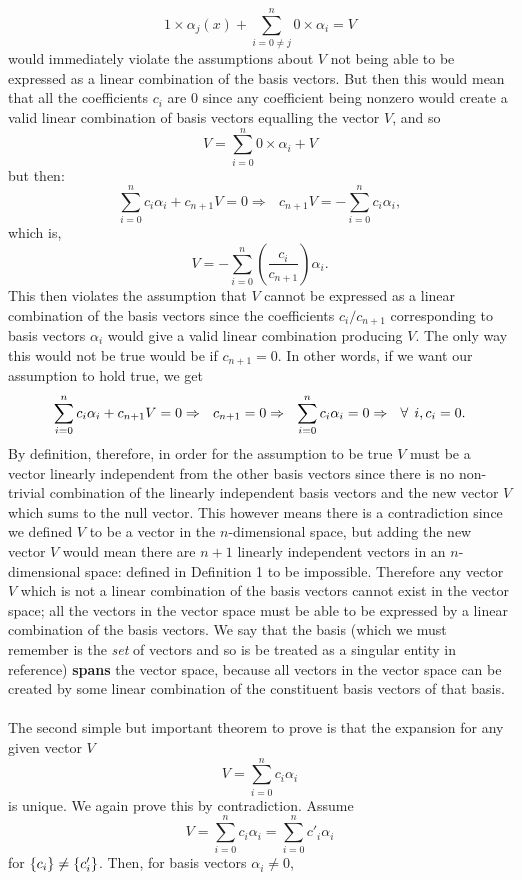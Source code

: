 $$
1\times\alpha_{j}(x)+ \sum_{i=0\neq j}^{n}0\times\alpha_{i}=V
$$ would immediately violate the assumptions about $V$ not being able to be expressed as a linear combination of the basis vectors.  But then this would mean that all the coefficients $c_{i}$ are $0$ since any coefficient being nonzero would create a valid linear combination of basis vectors equalling the vector ${V}$, and so
$$
V=\sum_{i=0}^{n}0\times\alpha_{i} + V
$$
but then:
$$
\sum_{i=0}^{n}c_{i}\alpha_{i} + c_{n+1}V= 0 \Rightarrow\:\:\: c_{n+1}V=-\sum_{i=0}^{n}c_{i}\alpha_{i},
$$
which is,
$$
V=-\sum_{i=0}^{n}\left(\frac{c_{i}}{c_{n+1}}\right)\alpha_{i}.
$$
This then violates the assumption that $V$ cannot be expressed as a linear combination of the basis vectors since the coefficients $c_{i}/c_{n+1}$ corresponding to basis vectors $\alpha_{i}$ would give a valid linear combination producing $V$. The only way this would not be true would be if $c_{n+1}=0$. In other words, if we want our assumption to hold true, we get
$$
\sum_{i=0}^{n}c_{i}\alpha_{i} + c_{n+1}V= 0 \Rightarrow\:\:\: c_{n+1}=0\Rightarrow\:\:\:\sum_{i=0}^{n}c_{i}\alpha_{i}=0\Rightarrow\:\:\:\forall\:\: i, c_{i}=0.
$$
By definition, therefore, in order for the assumption to be true $V$ must be a vector linearly independent from the other basis vectors since there is no non-trivial combination of the linearly independent basis vectors and the new vector $V$ which sums to the null vector. This however means there is a contradiction since we defined $V$ to be a vector in the $n$-dimensional space, but adding the new vector $V$ would mean there are $n+1$ linearly independent vectors in an $n$-dimensional space: defined in Definition 1 to be impossible. Therefore any vector ${V}$ which is not a linear combination of the basis vectors cannot exist in the vector space; all the vectors in the vector space must be able to be expressed by a linear combination of the basis vectors. We say that the basis (which we must remember is the \textit{set} of vectors and so is be treated as a singular entity in reference) \textbf{spans} the vector space, because all vectors in the vector space can be created by some linear combination of the constituent basis vectors of that basis.
\\\\
The second simple but important theorem to prove is that the expansion for any given vector $V$
$$
V = \sum_{i=0}^{n}c_{i}\alpha_{i}
$$
is unique. We again prove this by contradiction. Assume
$$
V = \sum_{i=0}^{n}c_{i}\alpha_{i}=\sum_{i=0}^{n}c'_{i}\alpha_{i}
$$
for $\{c_{i}\} \neq \{c'_{i}\}$. Then, for basis vectors $\alpha_{i} \neq 0$,
